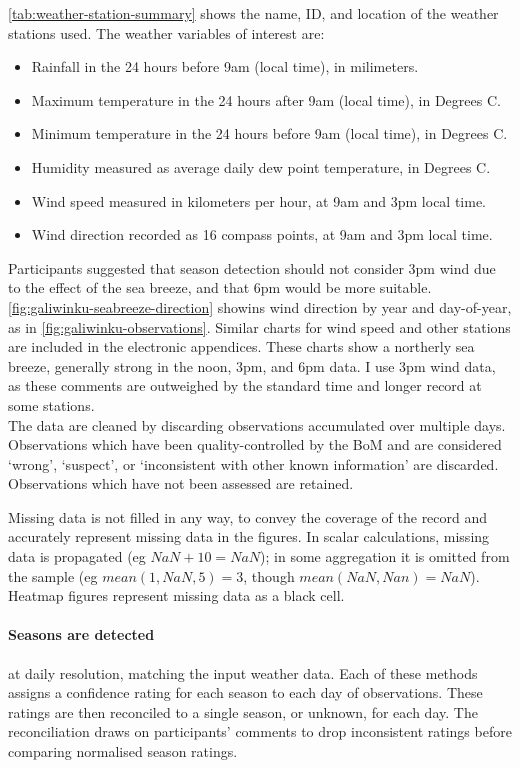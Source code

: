 \autoref{tab:weather-station-summary} shows the name, ID, and location of
the weather stations used.
%
The weather variables of interest are:
\begin{itemize}
\item Rainfall in the 24 hours before 9am (local time), in milimeters.
\item Maximum temperature in the 24 hours after 9am (local time), in Degrees C.
\item Minimum temperature in the 24 hours before 9am (local time), in Degrees C.
\item Humidity measured as average daily dew point temperature, in Degrees C.
\item Wind speed measured in kilometers per hour, at 9am and 3pm local time.
\item Wind direction recorded as 16 compass points, at 9am and 3pm local time.
\end{itemize}

Participants suggested that season detection should not consider 3pm wind
due to the effect of the sea breeze, and that 6pm would be more suitable.
\autoref{fig:galiwinku-seabreeze-direction} showins wind direction by year
and day-of-year, as in \autoref{fig:galiwinku-observations}.
%
Similar charts for wind speed and other stations are included in the electronic
appendices.  These charts show a northerly sea breeze, generally strong in the
noon, 3pm, and 6pm data.  I use 3pm wind data, as these comments are outweighed
by the standard time and longer record at some stations.\\

The data are cleaned by discarding observations accumulated over multiple days.
Observations which have been quality-controlled by the BoM and are considered
`wrong', `suspect', or `inconsistent with other known information' are discarded.
Observations which have not been assessed are retained.

Missing data is not filled in any way, to convey the coverage of the record
and accurately represent missing data in the figures.  In scalar calculations,
missing data is propagated (eg ${NaN+10=NaN}$); in some aggregation
it is omitted from the sample (eg ${mean(1,NaN,5)=3}$, though
${mean(NaN,Nan)=NaN}$). Heatmap figures represent missing data as a black cell.


\paragraph{Seasons are detected} at daily resolution, matching the input
weather data.
Each of these methods assigns a confidence rating for each season to each day of
observations.  These ratings are then reconciled to a single season, or unknown,
for each day.  The reconciliation draws on participants' comments to drop inconsistent
ratings before comparing normalised season ratings.


